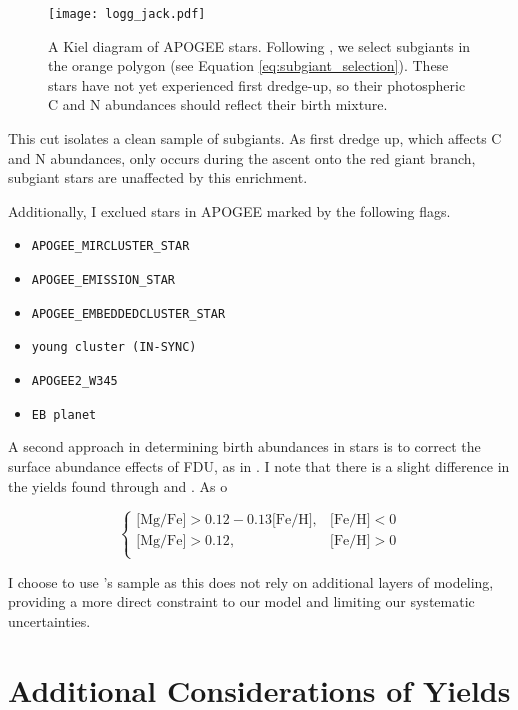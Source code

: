 \documentclass[12pt,oneside]{report}
\begin{document}
\begin{figure}
    \centering
    \texttt{[image: logg\_jack.pdf]}
    \caption[Subgiant selection]{
        A Kiel diagram of APOGEE stars. Following \citet{jack_subgiant}, we select subgiants in the orange polygon (see Equation \ref{eq:subgiant_selection}). These stars have not yet experienced first dredge-up, so their photospheric C and N abundances should reflect their birth mixture.
    }
\end{figure}

This cut isolates a clean sample of subgiants. As first dredge up, which affects C and N abundances, only occurs during the ascent onto the red giant branch, subgiant stars are unaffected by this enrichment. 

Additionally, I exclued stars in APOGEE marked by the following flags.
\begin{itemize}
\item \verb|APOGEE_MIRCLUSTER_STAR|
\item \verb|APOGEE_EMISSION_STAR|
\item \verb|APOGEE_EMBEDDEDCLUSTER_STAR|
\item \verb|young cluster (IN-SYNC)|
\item \verb|APOGEE2_W345|
\item \verb|EB planet|
\end{itemize}

A second approach in determining birth abundances in stars is to correct the surface abundance effects of FDU, as in \cite{fiorenzo+21}. I note that there is a slight difference in the yields found through \cite{fiorenzo+21} and \cite{jack_subgiant}. As o

\begin{equation}\label{eq:high_alpha}
\begin{cases}
\text{[Mg/Fe]} >0.12-0.13\text{[Fe/H]}, & \text{[Fe/H]}<0\\
\text{[Mg/Fe]} >0.12, & \text{[Fe/H]}>0\\
\end{cases}
\end{equation}



I choose to use \cite{jack_subgiant}'s sample as this does not rely on additional layers of modeling, providing a more direct constraint to our model and limiting our systematic uncertainties.

\newpage
\section{Additional Considerations of Yields}\label{sec:alt_agb}
\end{document}
